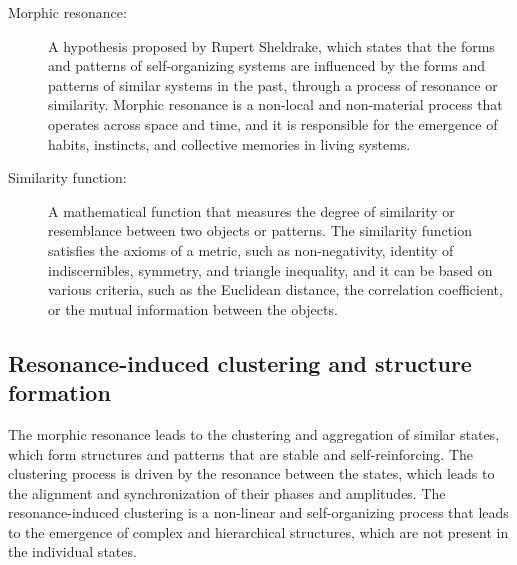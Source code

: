 \begin{tcolorbox}[colback=blue!5!white,colframe=blue!75!black,title=New terms]
\begin{description}
\item[Morphic resonance:] A hypothesis proposed by Rupert Sheldrake, which states that the forms and patterns of self-organizing systems are influenced by the forms and patterns of similar systems in the past, through a process of resonance or similarity. Morphic resonance is a non-local and non-material process that operates across space and time, and it is responsible for the emergence of habits, instincts, and collective memories in living systems.
\item[Similarity function:] A mathematical function that measures the degree of similarity or resemblance between two objects or patterns. The similarity function satisfies the axioms of a metric, such as non-negativity, identity of indiscernibles, symmetry, and triangle inequality, and it can be based on various criteria, such as the Euclidean distance, the correlation coefficient, or the mutual information between the objects.
\end{description}
\end{tcolorbox}

\subsection{Resonance-induced clustering and structure formation}
The morphic resonance leads to the clustering and aggregation of similar states, which form structures and patterns that are stable and self-reinforcing. The clustering process is driven by the resonance between the states, which leads to the alignment and synchronization of their phases and amplitudes. The resonance-induced clustering is a non-linear and self-organizing process that leads to the emergence of complex and hierarchical structures, which are not present in the individual states.


